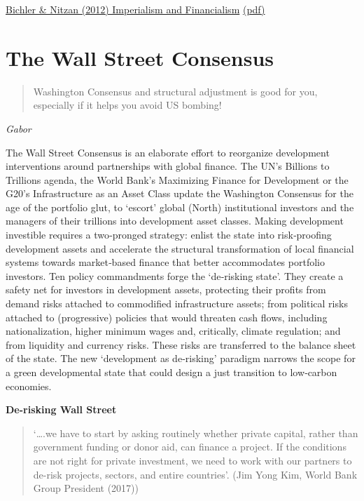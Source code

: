 \documentclass[
]{book}
\begin{document}
\href{http://bnarchives.yorku.ca/329/}{Bichler \& Nitzan (2012) Imperialism and Financialism}
\href{pdf/Bichler_Nitzan_2012_Imperialism_and_Financialism.pdf}{(pdf)}

\hypertarget{the-wall-street-consensus-1}{%
\chapter{The Wall Street Consensus}\label{the-wall-street-consensus-1}}

\begin{quote}
Washington Consensus and structural adjustment is good for you,
especially if it helps you avoid US bombing!
\end{quote}

\emph{Gabor}

The Wall Street Consensus is an elaborate effort to reorganize development interventions around partnerships with global finance. The UN's Billions to Trillions agenda, the World Bank's Maximizing Finance for Development or the G20's Infrastructure as an Asset Class update the Washington Consensus for the age of the portfolio glut, to `escort' global (North) institutional investors and the managers of their trillions into development asset classes. Making development investible requires a two‐pronged strategy: enlist the state into risk‐proofing development assets and accelerate the structural transformation of local financial systems towards market‐based finance that better accommodates portfolio investors. Ten policy commandments forge the `de‐risking state'. They create a safety net for investors in development assets, protecting their profits from demand risks attached to commodified infrastructure assets; from political risks attached to (progressive) policies that would threaten cash flows, including nationalization, higher minimum wages and, critically, climate regulation; and from liquidity and currency risks. These risks are transferred to the balance sheet of the state. The new `development as de‐risking' paradigm narrows the scope for a green developmental state that could design a just transition to low‐carbon economies.

\textbf{De-risking Wall Street}

\begin{quote}
`\ldots.we have to start by asking routinely whether private capital,
rather than government funding or donor aid, can finance a
project. If the conditions are not right for private investment, we
need to work with our partners to de-risk projects, sectors, and
entire countries'.
(Jim Yong Kim, World Bank Group President (2017))
\end{quote}
\end{document}

